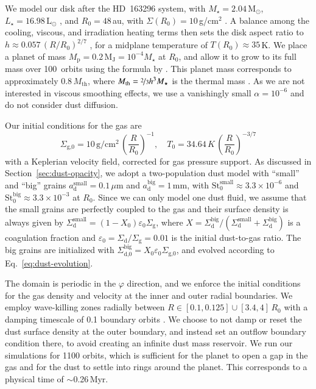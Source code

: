\documentclass[fleqn,usenatbib,useAMS]{mnras}
\newcommand{\Mstar}{M_\star}
\newcommand{\Lstar}{L_\star}
\newcommand{\Mp}{M_\mathrm{p}}
\newcommand{\Mth}{M_\mathrm{th}}
\newcommand{\Msun}{\mathrm{M}_\odot}
\newcommand{\Lsun}{\mathrm{L}_\odot}
\newcommand{\Mjup}{\mathrm{M}_\mathrm{J}}
\newcommand{\Sigmag}{\Sigma_\mathrm{g}}
\newcommand{\Sigmad}{\Sigma_\mathrm{d}}
\newcommand{\St}{\mathrm{St}}
\newcommand{\ad}{a_\mathrm{d}}
\begin{document}
We model our disk after the HD~163296 system, with $\Mstar=2.04\,\Msun$, $\Lstar=16.98\,\Lsun$ \citep{andrews-etal-2018}, and $R_0=48$\,au, with $\Sigma(R_0)=10$\,g/cm${}^2$ \citep{zhang-etal-2018}. A balance among the cooling, viscous, and irradiation heating terms then sets the disk aspect ratio to $h\approx0.057\,(R/R_0)^{2/7}$ \citep{chiang-goldreich-1997}, for a midplane temperature of $T(R_0)\approx35$\,K. We place a planet of mass $\Mp=0.2\,\Mjup = 10^{-4}\Mstar$ at $R_0$, and allow it to grow to its full mass over 100~orbits using the formula by \citet{devalborro-etal-2006}. This planet mass corresponds to approximately $0.8\,\Mth$, where $\Mth=\nicefrac{2}{3}h^3\Mstar$ is the thermal mass \citep{rafikov-2002}.
%
As we are not interested in viscous smoothing effects, we use a vanishingly small $\alpha=10^{-6}$ and do not consider dust diffusion.%

Our initial conditions for the gas are
%
\begin{equation}
	\label{eq:initial-conditions}
	\Sigma_\text{g,0} = 10\,\text{g}/\text{cm}^2\,\left(\frac{R}{R_0}\right)^{-1},\quad T_0 = 34.64\,K\,\left(\frac{R}{R_0}\right)^{-3/7}
\end{equation}
%
with a Keplerian velocity field, corrected for gas pressure support. As discussed in Section~\ref{sec:dust-opacity}, we adopt a two-population dust model with ``small'' and ``big'' grains $\ad^\text{small}=0.1\,\mu$m and $\ad^\text{big}=1$\,mm, with $\St_0^\text{small}\approx3.3\times10^{-6}$ and $\St_0^\text{big}\approx3.3\times10^{-3}$ at $R_0$. Since we can only model one dust fluid, we assume that the small grains are perfectly coupled to the gas and their surface density is always given by $\Sigmad^\text{small}=(1-X_0)\varepsilon_0\Sigmag$, where $X=\Sigmad^\text{big}/(\Sigmad^\text{small}+\Sigmad^\text{big})$ is a coagulation fraction and $\varepsilon_0=\Sigmad/\Sigmag=0.01$ is the initial dust-to-gas ratio. The big grains are initialized with $\Sigma_\text{d,0}^\text{big}=X_0\varepsilon_0\Sigma_\text{g,0}$, and evolved according to Eq.~\eqref{eq:dust-evolution}.

The domain is periodic in the $\varphi$ direction, and we enforce the initial conditions for the gas density and velocity at the inner and outer radial boundaries. We employ wave-killing zones radially between $R\in[0.1,0.125]\cup[3.4,4]\,R_0$ with a damping timescale of 0.1 boundary orbits \citep{devalborro-etal-2006}. We choose to not damp or reset the dust surface density at the outer boundary, and instead set an outflow boundary condition there, to avoid creating an infinite dust mass reservoir. We run our simulations for 1100 orbits, which is sufficient for the planet to open a gap in the gas and for the dust to settle into rings around the planet. This corresponds to a physical time of $\sim$0.26\,Myr.
\end{document}
